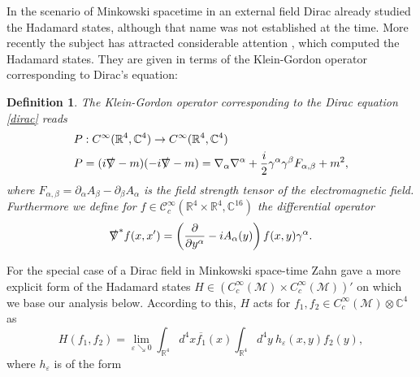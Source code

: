 \documentclass[b5paper,draft,openbib,12pt]{memoir}
\newtheorem{Def}{Definition}
\begin{document}
In the scenario of Minkowski spacetime in an external field Dirac \cite{Dirac34} already studied the Hadamard states, although that name was not established at the time.
More recently the subject has attracted considerable attention \cite{zahn2014renormalized, schlemmer2015current}, which computed the Hadamard states. 
They are given in terms of the Klein-Gordon operator corresponding to Dirac's equation:


\begin{Def}
The Klein-Gordon operator corresponding to the Dirac equation \eqref{dirac} reads
\begin{align}
&P: C^\infty(\mathbb{R}^4,\mathbb{C}^4)\rightarrow C^\infty(\mathbb{R}^4,\mathbb{C}^4)\\
&P=(i\slashed{\nabla}-m)(-i\slashed{\nabla}-m)=\nabla_\alpha \nabla^\alpha + \frac{i}{2} \gamma^\alpha \gamma^\beta F_{\alpha,\beta} +m^2,
\end{align}
where \(F_{\alpha,\beta}=\partial_\alpha A_\beta - \partial_\beta A_\alpha\) is the field strength tensor of the electromagnetic field. Furthermore we 
define for \(f\in \mathcal{C}_c^\infty(\mathbb{R}^4\times \mathbb{R}^4,\mathbb{C}^{16})\) the differential operator
\begin{equation}
\slashed{\nabla}^* f(x,x')=\left(\frac{\partial}{\partial y^\alpha} - i A_\alpha(y)\right)f(x,y)\gamma^\alpha.
\end{equation}
\end{Def}


For the special case of a Dirac field in Minkowski space-time Zahn \cite{schlemmer2015current} gave a more explicit form of
the Hadamard states \(H \in (C_c^\infty(\mathcal{M})\times C_c^\infty(\mathcal{M}))'\)  on which we base our analysis below.
According to this, \(H\) 
acts for \(f_1,f_2\in C_c^\infty(\mathcal{M})\otimes \mathbb{C}^4\) as 
\begin{equation}\label{eq:hadamard1}
H(f_1,f_2)=\lim_{\varepsilon\searrow 0} \int_{\mathbb{R}^4}d^4 x \overline{f_1}(x) \int_{\mathbb{R}^4} d^4y ~h_\varepsilon(x,y) f_2(y),
\end{equation}
where \(h_\varepsilon\) is of the form
\end{document}
